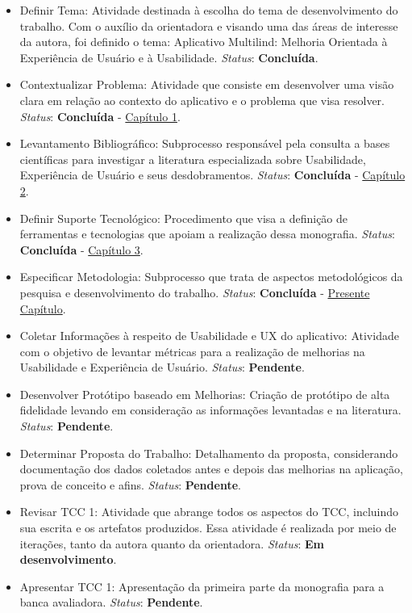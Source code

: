 \begin{itemize}
	\item Definir Tema: Atividade destinada à escolha do tema de desenvolvimento do trabalho. Com o auxílio da orientadora e visando uma das áreas de interesse da autora, foi definido o tema: Aplicativo Multilind: Melhoria Orientada à
	Experiência de Usuário e à Usabilidade. \textit{Status}: \textbf{Concluída}.
	\item Contextualizar Problema: Atividade que consiste em desenvolver uma visão clara em relação ao contexto do aplicativo e o problema que visa resolver. \textit{Status}: \textbf{Concluída} - \hyperref[chap:Introducao]{Capítulo 1}.
	\item Levantamento Bibliográfico: Subprocesso responsável pela consulta a bases científicas para investigar a literatura especializada sobre Usabilidade, Experiência de Usuário e seus desdobramentos. \textit{Status}: \textbf{Concluída} - \hyperref[chap:Referencial]{Capítulo 2}.
	\item Definir Suporte Tecnológico: Procedimento que visa a definição de ferramentas e tecnologias que apoiam a realização dessa monografia. \textit{Status}: \textbf{Concluída} - \hyperref[chap:ReferencialTech]{Capítulo 3}.
	\item Especificar Metodologia: Subprocesso que trata de aspectos metodológicos da pesquisa e desenvolvimento do trabalho. \textit{Status}: \textbf{Concluída} - \hyperref[chap:Metodologia]{Presente Capítulo}.
	\item Coletar Informações à respeito de Usabilidade e UX do aplicativo: Atividade com o objetivo de levantar métricas para a realização de melhorias na Usabilidade e Experiência de Usuário. \textit{Status}: \textbf{Pendente}.
	\item Desenvolver Protótipo baseado em Melhorias: Criação de protótipo de alta fidelidade levando em consideração as informações levantadas e na literatura. \textit{Status}: \textbf{Pendente}.
	\item Determinar Proposta do Trabalho: Detalhamento da proposta, considerando documentação dos dados coletados antes e depois das melhorias na aplicação, prova de conceito e afins. \textit{Status}: \textbf{Pendente}.
	\item Revisar TCC 1: Atividade que abrange todos os aspectos do TCC, incluindo sua escrita e os artefatos produzidos. Essa atividade é realizada por meio de iterações, tanto da autora quanto da orientadora. \textit{Status}: \textbf{Em desenvolvimento}.
	\item Apresentar TCC 1: Apresentação da primeira parte da monografia para a banca avaliadora. \textit{Status}: \textbf{Pendente}.
\end{itemize}

